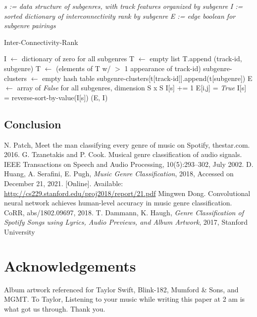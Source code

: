 \documentclass[conference]{IEEEtran}
\begin{document}
\begin{algorithm} 
\textit{s := data structure of subgenres, with track features organized by subgenre}
\newline
\textit{I := sorted dictionary of interconnectivity rank by subgenre}
\newline
\textit{E := edge boolean for subgenre pairings}
\newline
{}
\newline
\begin{algorithmic}[H]
\caption{Inter-Connectivity-Rank}
\STATE I $\gets$ dictionary of zero for all subgenres
\STATE T $\gets$ empty list
\STATE T.append (track-id, subgenre) 
\ENDFOR
\ENDFOR
\STATE T $\gets$ (elements of T w/ $>$ 1 appearance of track-id)
\STATE subgenre-clusters $\gets$ empty hash table
\STATE subgenre-clusters[t[track-id]].append(t[subgenre])
\ENDFOR
\STATE E $\gets$ array of \emph{False} for all subgenres, dimension S x S
\STATE I[s] += 1
\ENDFOR
{}
\STATE E[i,j] = \emph{True}
\ENDIF
\ENDFOR
\ENDFOR
\STATE I[s] = reverse-sort-by-value(I[s])
\RETURN (E, I)
\end{algorithmic}
\end{algorithm}

\subsection{Conclusion}




\begin{thebibliography}{00}
 N. Patch, Meet the man classifying every genre of music on Spotify, thestar.com. 2016.
 G. Tzanetakis and P. Cook. Musical genre classification of audio signals. IEEE Transactions on Speech and Audio Processing, 10(5):293–302, July 2002.
 D. Huang, A. Serafini, E. Pugh, \emph{Music Genre Classification}, 2018, Accessed on December 21, 2021. [Online]. Available: \url{http://cs229.stanford.edu/proj2018/report/21.pdf}
 Mingwen Dong. Convolutional neural network achieves human-level accuracy in music genre classification. CoRR, abs/1802.09697, 2018.
 T. Dammann, K. Haugh, \emph{Genre Classification of Spotify Songs using Lyrics, Audio Previews, and Album Artwork}, 2017, Stanford University

\end{thebibliography}

\section*{Acknowledgements}
Album artwork referenced for Taylor Swift, Blink-182, Mumford \& Sons, and MGMT.
\newline
\newline
To Taylor,
\newline
\newline
Listening to your music while writing this paper at 2 am is what got us through. 
\newline
\newline
Thank you.
\end{document}

